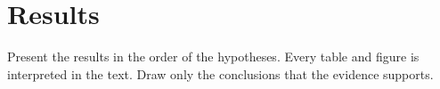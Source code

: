 \chapter{Results}

Present the results in the order of the hypotheses. Every table and figure is interpreted in the text. Draw only the conclusions that the evidence supports.
